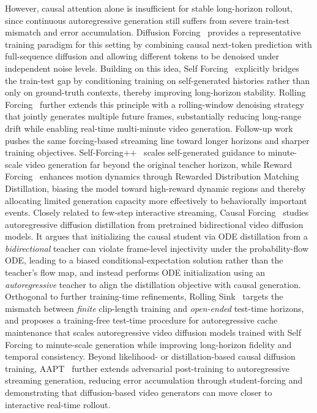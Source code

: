 \documentclass[lettersize,journal]{IEEEtran}
\begin{document}
However, causal attention alone is insufficient for stable long-horizon rollout, since continuous autoregressive generation still suffers from severe train-test mismatch and error accumulation. Diffusion Forcing~\cite{chen2024diffusionforcing} provides a representative training paradigm for this setting by combining causal next-token prediction with full-sequence diffusion and allowing different tokens to be denoised under independent noise levels. Building on this idea, Self Forcing~\cite{huang2025selfforcing} explicitly bridges the train-test gap by conditioning training on self-generated histories rather than only on ground-truth contexts, thereby improving long-horizon stability. Rolling Forcing~\cite{rollingforcing2025} further extends this principle with a rolling-window denoising strategy that jointly generates multiple future frames, substantially reducing long-range drift while enabling real-time multi-minute video generation.
Follow-up work pushes the same forcing-based streaming line toward longer horizons and sharper training objectives. Self-Forcing++~\cite{cui2025selfforcingplus} scales self-generated guidance to minute-scale video generation far beyond the original teacher horizon, while Reward Forcing~\cite{lu2025rewardforcing} enhances motion dynamics through Rewarded Distribution Matching Distillation, biasing the model toward high-reward dynamic regions and thereby allocating limited generation capacity more effectively to behaviorally important events.
Closely related to few-step interactive streaming, Causal Forcing~\cite{zhu2026causalforcing} studies autoregressive diffusion distillation from pretrained bidirectional video diffusion models. It argues that initializing the causal student via ODE distillation from a \emph{bidirectional} teacher can violate frame-level injectivity under the probability-flow ODE, leading to a biased conditional-expectation solution rather than the teacher's flow map, and instead performs ODE initialization using an \emph{autoregressive} teacher to align the distillation objective with causal generation.
Orthogonal to further training-time refinements, Rolling Sink~\cite{li2026rollingsink} targets the mismatch between \emph{finite} clip-length training and \emph{open-ended} test-time horizons, and proposes a training-free test-time procedure for autoregressive cache maintenance that scales autoregressive video diffusion models trained with Self Forcing to minute-scale generation while improving long-horizon fidelity and temporal consistency.
Beyond likelihood- or distillation-based causal diffusion training, AAPT~\cite{lin2025aapt} further extends adversarial post-training to autoregressive streaming generation, reducing error accumulation through student-forcing and demonstrating that diffusion-based video generators can move closer to interactive real-time rollout.
\end{document}
